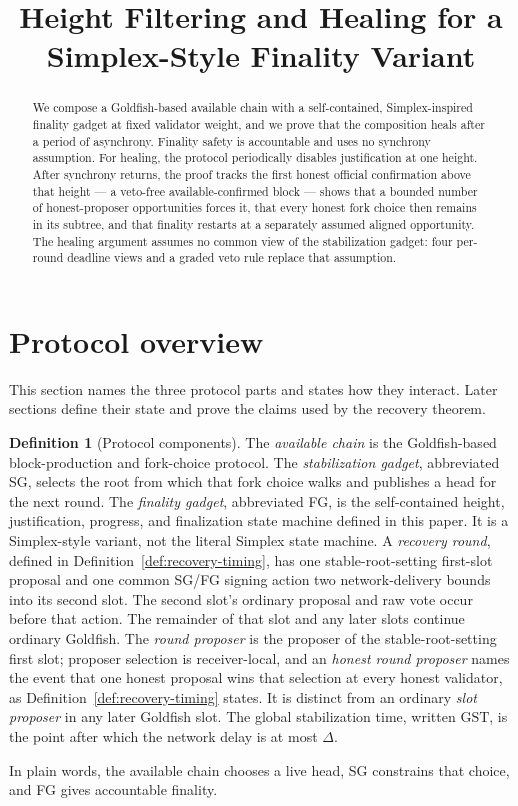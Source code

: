 \ifx\litemode\undefined\documentclass{article}\fi
\title{Height Filtering and Healing for a Simplex-Style Finality Variant}
\author{}
\date{}
\theoremstyle{plain}
\theoremstyle{definition}
\newtheorem{definition}{Definition}
\theoremstyle{remark}
\newcommand{\GST}{\mathrm{GST}}
\begin{document}
\maketitle

\begin{abstract}
We compose a Goldfish-based available chain with a self-contained,
Simplex-inspired finality gadget at fixed validator weight, and we prove
that the composition heals after a period of asynchrony.  Finality
safety is accountable and uses no synchrony assumption.  For healing,
the protocol periodically disables justification at one height.  After
synchrony returns, the proof tracks the first honest official
confirmation above that height --- a veto-free available-confirmed
block --- shows that a bounded number of honest-proposer opportunities
forces it, that every honest fork choice then remains in its subtree,
and that finality restarts at a separately assumed aligned opportunity.
The healing argument assumes no common view of the stabilization
gadget: four per-round deadline views and a graded veto rule replace
that assumption.
\end{abstract}

\section{Protocol overview}\label{sec:overview}

This section names the three protocol parts and states how they interact.
Later sections define their state and prove the claims used by the recovery
theorem.

\begin{definition}[Protocol components]\label{def:protocol-components}
The \emph{available chain} is the Goldfish-based block-production and
fork-choice protocol.  The \emph{stabilization gadget}, abbreviated SG,
selects the root from which that fork choice walks and publishes a head for
the next round.  The \emph{finality gadget}, abbreviated FG, is the
self-contained height, justification, progress, and finalization state
machine defined in this paper.  It is a Simplex-style variant, not the
literal Simplex state machine.  A
 \emph{recovery round}, defined in Definition~\ref{def:recovery-timing}, has
 one stable-root-setting first-slot proposal and one common SG/FG signing
 action two network-delivery bounds into its second slot.  The second slot's
 ordinary proposal and raw vote occur before that action.  The remainder of
 that slot and any later slots continue ordinary Goldfish.
The \emph{round proposer} is the proposer of the stable-root-setting first
slot; proposer selection is receiver-local, and an \emph{honest round
proposer} names the event that one honest proposal wins that selection
at every honest validator, as Definition~\ref{def:recovery-timing}
states.  It is distinct from an ordinary \emph{slot proposer} in any
later Goldfish slot.  The global stabilization time, written \(\GST\), is the point after
which the network delay is at most \(\Delta\).

In plain words, the available chain chooses a live head, SG constrains that
choice, and FG gives accountable finality.
\end{definition}
\end{document}
